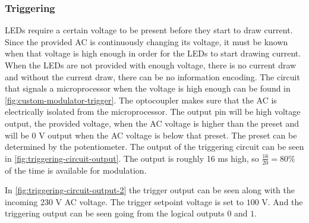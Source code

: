 	\subsubsection{Triggering}
	\label{subsubsec:triggering}

	LEDs require a certain voltage to be present before they start to draw current.
	Since the provided AC is continuously changing its voltage, it must be known when that voltage is high enough in order for the LEDs to start drawing current.
	When the LEDs are not provided with enough voltage, there is no current draw and without the current draw, there can be no information encoding.
	The circuit that signals a microprocessor when the voltage is high enough can be found in \autoref{fig:custom-modulator-trigger}.
	The optocoupler makes sure that the AC is electrically isolated from the microprocessor.
	The output pin will be high voltage output, the provided voltage, when the AC voltage is higher than the preset and will be 0 V output when the AC voltage is below that preset.
	The preset can be determined by the potentiometer.
	The output of the triggering circuit can be seen in \autoref{fig:triggering-circuit-output}.
	The output is roughly 16 ms high, so $\frac{16}{20} = 80 \%$ of the time is available for modulation.
	

	In \autoref{fig:triggering-circuit-output-2} the trigger output can be seen along with the incoming 230 V AC voltage.
	The trigger setpoint voltage is set to $100$ V.
	And the triggering output can be seen going from the logical outputs $0$ and $1$.



